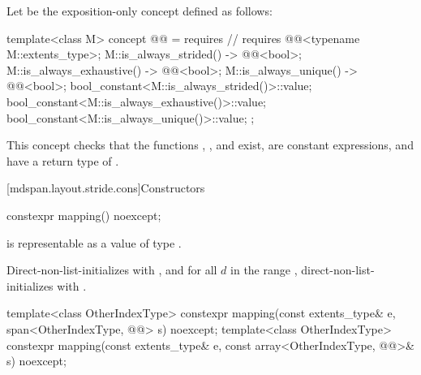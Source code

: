 \pnum
Let  be the exposition-only concept
defined as follows:
\begin{codeblock}
template<class M>
concept @@ = requires {                         // \expos
  requires @@<typename M::extents_type>;
  { M::is_always_strided() } -> @@<bool>;
  { M::is_always_exhaustive() } -> @@<bool>;
  { M::is_always_unique() } -> @@<bool>;
  bool_constant<M::is_always_strided()>::value;
  bool_constant<M::is_always_exhaustive()>::value;
  bool_constant<M::is_always_unique()>::value;
};
\end{codeblock}
\begin{note}
This concept checks that the functions
,
, and
 exist,
are constant expressions, and
have a return type of .
\end{note}

[mdspan.layout.stride.cons]{Constructors}

%
\begin{itemdecl}
constexpr mapping() noexcept;
\end{itemdecl}

\begin{itemdescr}
\pnum
\expects
{}
is representable as a value of type .

\pnum
\effects
Direct-non-list-initializes  with , and
for all $d$ in the range ,
direct-non-list-initializes  with
.
\end{itemdescr}

%
\begin{itemdecl}
template<class OtherIndexType>
  constexpr mapping(const extents_type& e, span<OtherIndexType, @@> s) noexcept;
template<class OtherIndexType>
  constexpr mapping(const extents_type& e, const array<OtherIndexType, @@>& s) noexcept;
\end{itemdecl}

